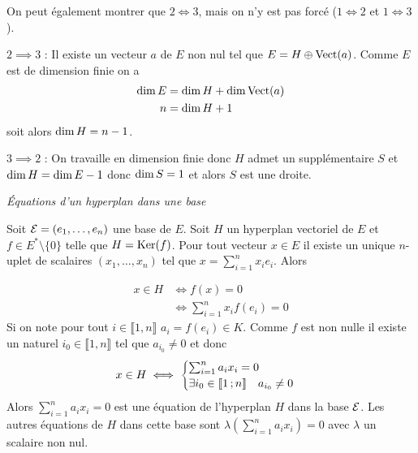 On peut également montrer que \(2 \iff 3\), mais on n'y est pas forcé (\(1 \iff 
2\) et \(1 \iff 3\)).

\(2 \implies 3\) : Il existe un vecteur \(a\) de \(E\) non nul tel que \(E=H 
\oplus \operatorname{Vect}(a)\). Comme \(E\) est de dimension finie on a
\begin{align}
  \operatorname{dim} E &= \operatorname{dim} H +\operatorname{dim} \operatorname{Vect}(a)\\
  n &= \operatorname{dim} H +1
\end{align}
soit alors \(\operatorname{dim} H = n-1\).

\(3 \implies 2\) : On travaille en dimension finie donc \(H\) admet un 
supplémentaire \(S\) et \(\operatorname{dim} H = \operatorname{dim} E -1\) donc \(\operatorname{dim} S=1\) et alors \(S\) 
est une droite.

\emph{Équations d'un hyperplan dans une base}

Soit \(\mathcal{E}=(e_1, \ldots, e_n)\) une base de \(E\). Soit \(H\) un hyperplan 
vectoriel de \(E\) et \(f \in E^*\setminus\{0\}\) telle que \(H=\operatorname{Ker}(f)\). Pour 
tout vecteur \(x \in E\) il existe un unique \(n\)-uplet de scalaires 
\((x_1,\ldots, x_n)\) tel que \(x = \sum_{i=1}^n x_i e_i\). Alors

\begin{align}
  x \in H &\iff f(x)=0\\
  &\iff \sum_{i=1}^n x_i f(e_i)=0
\end{align}
Si on note pour tout \(i \in \llbracket 1,n \rrbracket\) \(a_i=f(e_i) \in K\). 
Comme \(f\) est non nulle il existe un naturel \(i_0 \in \llbracket 1,n 
\rrbracket\) tel que \(a_{i_0} \neq 0\) et donc
\begin{equation}
  x \in H \iff
  \begin{cases}
    \sum_{i=1}^n a_i x_i=0 \\ \exists i_0 \in \mathopen{\llbracket}1\mathclose{}\mathpunct{};n\mathclose{\rrbracket} \quad 
    a_{i_0} \neq 0
  \end{cases}
\end{equation}
Alors \(\sum_{i=1}^n a_i x_i=0\) est une équation de l'hyperplan \(H\) dans la 
base \(\mathcal{E}\). Les autres équations de \(H\) dans cette base sont \(\lambda 
\left(\sum_{i=1}^n a_i x_i\right)=0\) avec \(\lambda\) un scalaire non nul.

